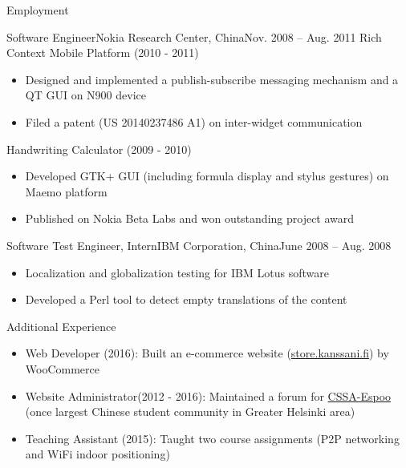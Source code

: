 \documentclass[print]{mcdowellcv}
\begin{document}
\begin{cvsection}{Employment}
		\begin{cvsubsection}{Software Engineer}{Nokia Research Center, China}{Nov. 2008 -- Aug. 2011}
			Rich Context Mobile Platform (2010 - 2011)
			\begin{itemize}
				\item Designed and implemented a publish-subscribe messaging mechanism and a QT GUI on N900 device
				\item Filed a patent (US 20140237486 A1) on inter-widget communication
			\end{itemize}
			\smallskip
			Handwriting Calculator (2009 - 2010)
			\begin{itemize}
				\item Developed GTK+ GUI (including formula display and stylus gestures) on Maemo platform
				\item Published on Nokia Beta Labs and won outstanding project award
			\end{itemize}
		\end{cvsubsection}

		\begin{cvsubsection}{Software Test Engineer, Intern}{IBM Corporation, China}{June 2008 -- Aug. 2008}			
			\begin{itemize}
				\item Localization and globalization testing for IBM Lotus software
				\item Developed a Perl tool to detect empty translations of the content
			\end{itemize}
		\end{cvsubsection}
	\end{cvsection}

	\begin{cvsection}{Additional Experience}
		\begin{cvsubsection}{}{}{}	
			\begin{itemize}
				\item Web Developer (2016): Built an e-commerce website (\url{store.kanssani.fi}) by WooCommerce
				\item Website Administrator(2012 - 2016): Maintained a forum for \href{https://cssa.ayy.fi}{CSSA-Espoo}
				(once largest Chinese student community in Greater Helsinki area)
				\item Teaching Assistant (2015): Taught two course assignments (P2P networking and WiFi indoor positioning)
			\end{itemize}
		\end{cvsubsection}
	\end{cvsection}
	
\end{document}
